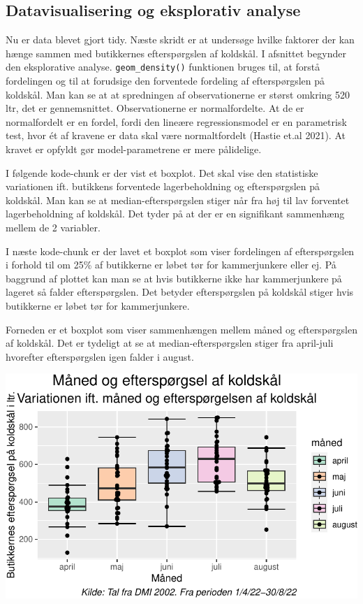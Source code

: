 \documentclass[
  12pt,
  a4paper,
  DIV=11,
  numbers=noendperiod]{scrartcl}
\begin{document}
\hypertarget{datavisualisering-og-eksplorativ-analyse}{%
\subsection{Datavisualisering og eksplorativ
analyse}\label{datavisualisering-og-eksplorativ-analyse}}

Nu er data blevet gjort tidy. Næste skridt er at undersøge hvilke
faktorer der kan hænge sammen med butikkernes efterspørgslen af
koldskål. I afsnittet begynder den eksplorative analyse.
\texttt{geom\_density()} funktionen bruges til, at forstå fordelingen og
til at forudsige den forventede fordeling af efterspørgslen på koldskål.
Man kan se at at spredningen af observationerne er størst omkring 520
ltr, det er gennemsnittet. Observationerne er normalfordelte. At de er
normalfordelt er en fordel, fordi den lineære regressionsmodel er en
parametrisk test, hvor ét af kravene er data skal være normaltfordelt
(Hastie et.al 2021). At kravet er opfyldt gør model-parametrene er mere
pålidelige.

I følgende kode-chunk er der vist et boxplot. Det skal vise den
statistiske variationen ift. butikkens forventede lagerbeholdning og
efterspørgslen på koldskål. Man kan se at median-efterspørgslen stiger
når fra høj til lav forventet lagerbeholdning af koldskål. Det tyder på
at der er en signifikant sammenhæng mellem de 2 variabler.

I næste kode-chunk er der lavet et boxplot som viser fordelingen af
efterspørgslen i forhold til om 25\% af butikkerne er løbet tør for
kammerjunkere eller ej. På baggrund af plottet kan man se at hvis
butikkerne ikke har kammerjunkere på lageret så falder efterspørgslen.
Det betyder efterspørgslen på koldskål stiger hvis butikkerne er løbet
tør for kammerjunkere.

Forneden er et boxplot som viser sammenhængen mellem måned og
efterspørgslen af koldskål. Det er tydeligt at se at
median-efterspørgslen stiger fra april-juli hvorefter efterspørgslen
igen falder i august.

\includegraphics{Semester_projekt_2022_G1_files/figure-pdf/Chunk 10 - Boxplot over efterspørgsel og måned-1.pdf}
\end{document}
